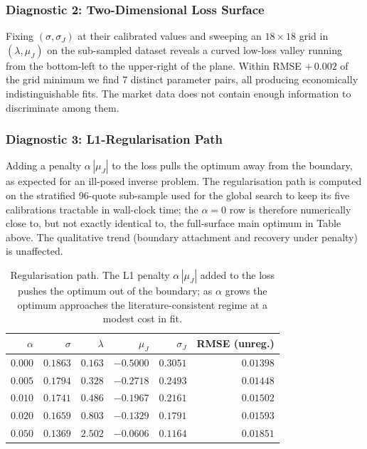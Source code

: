 \subsubsection*{Diagnostic 2: Two-Dimensional Loss Surface}

Fixing $(\sigma, \sigma_J)$ at their calibrated values and sweeping an
$18 \times 18$ grid in $(\lambda, \mu_J)$ on the sub-sampled dataset
reveals a curved low-loss valley running from the bottom-left to the
upper-right of the plane. Within RMSE $+\,0.002$ of the grid minimum we
find 7 distinct parameter pairs, all producing economically
indistinguishable fits. The market data does not contain enough
information to discriminate among them.


\subsubsection*{Diagnostic 3: L1-Regularisation Path}

Adding a penalty $\alpha\,|\mu_J|$ to the loss pulls the optimum away
from the boundary, as expected for an ill-posed inverse problem. The
regularisation path is computed on the stratified 96-quote sub-sample
used for the global search to keep its five calibrations tractable in
wall-clock time; the $\alpha = 0$ row is therefore numerically close
to, but not exactly identical to, the full-surface main optimum in
Table above. The qualitative trend (boundary attachment and recovery
under penalty) is unaffected.

\begin{table}[H]
\centering
\caption{Regularisation path. The L1 penalty $\alpha\,|\mu_J|$ added to
the loss pushes the optimum out of the boundary; as $\alpha$ grows the
optimum approaches the literature-consistent regime at a modest cost
in fit.}
\begin{tabular}{rrrrrr}
\toprule
$\alpha$ & $\sigma$ & $\lambda$ & $\mu_J$   & $\sigma_J$ & RMSE (unreg.) \\
\midrule
$0.000$  & $0.1863$ & $0.163$   & $-0.5000$ & $0.3051$   & $0.01398$ \\
$0.005$  & $0.1794$ & $0.328$   & $-0.2718$ & $0.2493$   & $0.01448$ \\
$0.010$  & $0.1741$ & $0.486$   & $-0.1967$ & $0.2161$   & $0.01502$ \\
$0.020$  & $0.1659$ & $0.803$   & $-0.1329$ & $0.1791$   & $0.01593$ \\
$0.050$  & $0.1369$ & $2.502$   & $-0.0606$ & $0.1164$   & $0.01851$ \\
\bottomrule
\end{tabular}
\end{table}

